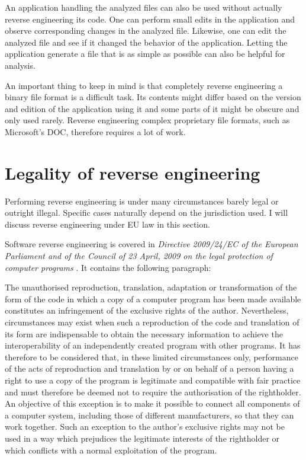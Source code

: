 \documentclass[thesis=B,english]{FITthesis}[2012/10/20]
\begin{document}
	An application handling the analyzed files can also be used without actually reverse engineering its code. One can perform small edits in the application and observe corresponding changes in the analyzed file. Likewise, one can edit the analyzed file and see if it changed the behavior of the application. Letting the application generate a file that is as simple as possible can also be helpful for analysis.
	
	An important thing to keep in mind is that completely reverse engineering a binary file format is a difficult task. Its contents might differ based on the version and edition of the application using it and some parts of it might be obscure and only used rarely. Reverse engineering complex proprietary file formats, such as Microsoft's DOC, therefore requires a lot of work.
	
	\section{Legality of reverse engineering}
	
	Performing reverse engineering is under many circumstances barely legal or outright illegal. Specific cases naturally depend on the jurisdiction used. I will discuss reverse engineering under EU law in this section. 
	
	Software reverse engineering is covered in \textit{Directive 2009/24/EC of the European Parliament and of the Council of 23 April, 2009 on the legal protection of computer programs} \cite{law}. It contains the following paragraph: 
	
	\begin{displayquote}
		The unauthorised reproduction, translation, adaptation or transformation of the form of the code in which a copy of a computer program has been made available constitutes an infringement of the exclusive rights of the author. Nevertheless, circumstances may exist when such a reproduction of the code and translation of its form are indispensable to obtain the necessary information to achieve the interoperability of an independently created program with other programs. It has therefore to be considered that, in these limited circumstances only, performance of the acts of reproduction and translation by or on behalf of a person having a right to use a copy of the program is legitimate and compatible with fair practice and must therefore be deemed not to require the authorisation of the rightholder. An objective of this exception is to make it possible to connect all components of a computer system, including those of different manufacturers, so that they can work together. Such an exception to the author's exclusive rights may not be used in a way which prejudices the legitimate interests of the rightholder or which conflicts with a normal exploitation of the program.
	\end{displayquote}
	
\end{document}
